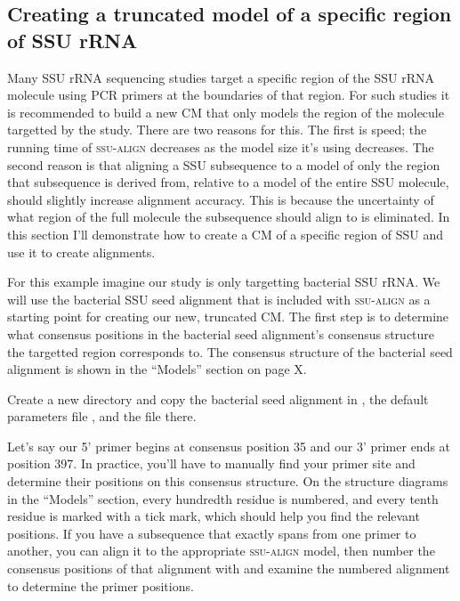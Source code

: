 
\subsection{Creating a truncated model of a specific region of SSU rRNA}

Many SSU rRNA sequencing studies target a specific region of the SSU
rRNA molecule using PCR primers at the boundaries of that region. For
such studies it is recommended to build a new CM that only models the
region of the molecule targetted by the study. There are two reasons
for this. The first is speed; the running time of \textsc{ssu-align}
decreases as the model size it's using decreases. The second reason is
that aligning a SSU subsequence to a model of only the region that
subsequence is derived from, relative to a model of the entire SSU
molecule, should slightly increase alignment accuracy. This is because
the uncertainty of what region of the full molecule the subsequence
should align to is eliminated. In this section I'll demonstrate how to
create a CM of a specific region of SSU and use it to create
alignments. 

For this example imagine our study is only targetting bacterial SSU
rRNA. We will use the bacterial SSU seed alignment that is included
with \textsc{ssu-align} as a starting point for creating our new,
truncated CM. The first step is to determine what consensus positions
in the bacterial seed alignment's consensus structure the targetted
region corresponds to. The consensus structure of the bacterial seed
alignment is shown in the ``Models'' section on page X.

Create a new directory and copy the bacterial seed alignment in
, the default parameters
file , and the file 
there.

Let's say our 5' primer begins at consensus position 35 and our 3'
primer ends at position 397.  In practice, you'll have to manually
find your primer site and determine their positions on this consensus
structure. On the structure diagrams in the ``Models'' section, every
hundredth residue is numbered, and every tenth residue is marked with
a tick mark, which should help you find the relevant positions.  If
you have a subsequence that exactly spans from one primer to another,
you can align it to the appropriate \textsc{ssu-align} model, then
number the consensus positions of that alignment with
 and examine the numbered alignment to
determine the primer positions.

